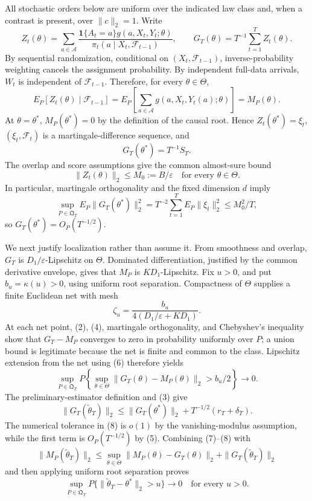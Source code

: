 All stochastic orders below are uniform over the indicated law class and, when a contrast is present, over \(\|c\|_2=1\). Write
\[
 Z_t(\theta)=\sum_{a\in\mathcal A}
 \frac{\mathbf 1\{A_t=a\}g(a,X_t,Y_t;\theta)}
 {\pi_t(a\mid X_t,\mathcal F_{t-1})},
 \qquad G_T(\theta)=T^{-1}\sum_{t=1}^T Z_t(\theta).
\tag{1}
\]
By sequential randomization, conditional on \((X_t,\mathcal F_{t-1})\), inverse-probability weighting cancels the assignment probability. By independent full-data arrivals, \(W_t\) is independent of \(\mathcal F_{t-1}\). Therefore, for every \(\theta\in\Theta\),
\[
 E_P[Z_t(\theta)\mid\mathcal F_{t-1}]
 =E_P\!\left[\sum_{a\in\mathcal A}g(a,X_t,Y_t(a);\theta)\right]
 =M_P(\theta).
\tag{2}
\]
At \(\theta=\theta^*\), \(M_P(\theta^*)=0\) by the definition of the causal root. Hence \(Z_t(\theta^*)=\xi_t\), \((\xi_t,\mathcal F_t)\) is a martingale-difference sequence, and
\[
 G_T(\theta^*)=T^{-1}S_T.
\tag{3}
\]
The overlap and score assumptions give the common almost-sure bound
\[
 \|Z_t(\theta)\|_2\le M_0:=B/\varepsilon
 \quad\text{for every }\theta\in\Theta.
\tag{4}
\]
In particular, martingale orthogonality and the fixed dimension \(d\) imply
\[
 \sup_{P\in\mathfrak Q_T}E_P\|G_T(\theta^*)\|_2^2
 =T^{-2}\sum_{t=1}^TE_P\|\xi_t\|_2^2
 \le M_0^2/T,
\tag{5}
\]
so \(G_T(\theta^*)=O_P(T^{-1/2})\).

We next justify localization rather than assume it. From smoothness and overlap, \(G_T\) is \(D_1/\varepsilon\)-Lipschitz on \(\Theta\). Dominated differentiation, justified by the common derivative envelope, gives that \(M_P\) is \(KD_1\)-Lipschitz. Fix \(u>0\), and put \(b_u=\kappa(u)>0\), using uniform root separation. Compactness of \(\Theta\) supplies a finite Euclidean net with mesh
\[
 \zeta_u=\frac{b_u}{4(D_1/\varepsilon+KD_1)}.
\tag{6}
\]
At each net point, (2), (4), martingale orthogonality, and Chebyshev's inequality show that \(G_T-M_P\) converges to zero in probability uniformly over \(P\); a union bound is legitimate because the net is finite and common to the class. Lipschitz extension from the net using (6) therefore yields
\[
 \sup_{P\in\mathfrak Q_T}P\!\left\{
 \sup_{\theta\in\Theta}\|G_T(\theta)-M_P(\theta)\|_2>b_u/2
 \right\}\longrightarrow0.
\tag{7}
\]
The preliminary-estimator definition and (3) give
\[
 \|G_T(\widetilde\theta_T)\|_2
 \le \|G_T(\theta^*)\|_2+T^{-1/2}(r_T+\delta_T).
\tag{8}
\]
The numerical tolerance in (8) is \(o(1)\) by the vanishing-modulus assumption, while the first term is \(O_P(T^{-1/2})\) by (5). Combining (7)--(8) with
\[
 \|M_P(\widetilde\theta_T)\|_2
 \le\sup_{\theta\in\Theta}\|M_P(\theta)-G_T(\theta)\|_2
     +\|G_T(\widetilde\theta_T)\|_2
\tag{9}
\]
and then applying uniform root separation proves
\[
 \sup_{P\in\mathfrak Q_T}P\{\|\widetilde\theta_T-\theta^*\|_2>u\}
 \longrightarrow0
 \quad\text{for every }u>0.
\tag{10}
\]

